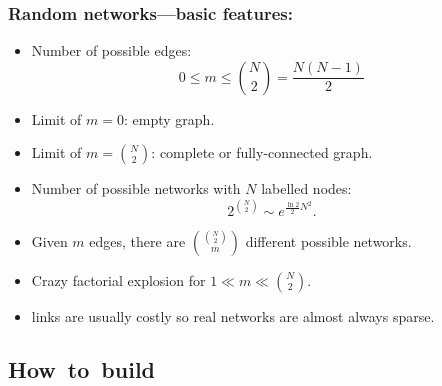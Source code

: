 \begin{frame}[label=]
  \frametitle{Random networks---basic features:}

    \begin{itemize}
    \item<1-> 
      Number of possible edges:
      $$
      0 \le m \le \binom{N}{2} = \frac{N(N-1)}{2}
      $$
    \item<2->
      Limit of $m = 0$: empty graph.
    \item<3->      
      Limit of $m = \binom{N}{2}$: complete or fully-connected graph.
    \item<4->
      Number of possible networks with $N$
      labelled nodes: 
      $$
      2^{\binom{N}{2}} \sim e^{\frac{\ln{2}}{2} N^2}.
      $$
    \item<5->
      Given $m$ edges, there are 
      $ \binom{\binom{N}{2}}{m} $
      different possible networks.
    \item<6->
      Crazy factorial explosion for $1 \ll m \ll \binom{N}{2}$.
    \item<7->
       links are usually costly
      so real networks are almost always \alert{sparse}.
    \end{itemize}
  
\end{frame}


\subsection{How\ to\ build}

